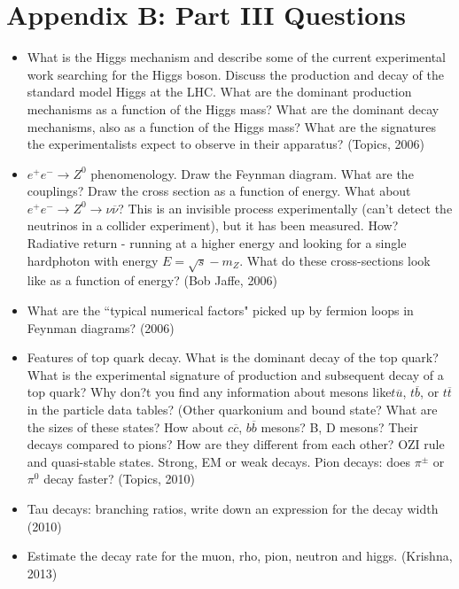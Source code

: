 \documentclass[11pt, oneside]{article}   	%
\theoremstyle{definition}
\numberwithin{equation}{subsection}		%
\begin{document}
\newpage
\section*{Appendix B: Part III Questions}

\begin{itemize}
	\item What is the Higgs mechanism and describe some of the current experimental work searching for the Higgs boson. Discuss the 
	production and decay of the standard model Higgs at the LHC. What are the dominant production mechanisms as a function of the 
	Higgs mass? What are the dominant decay mechanisms, also as a function of the Higgs mass? What are the signatures the 
	experimentalists expect to observe in their apparatus? (Topics, 2006)
	
	\item $e^+ e^-\rightarrow Z^0$ phenomenology. Draw the Feynman diagram. What are the couplings? Draw the cross section as a 
	function of energy. What about $e^+ e^-\rightarrow Z^0 \rightarrow\nu \overline\nu$? This is an invisible process experimentally (can't 
	detect the neutrinos in a collider experiment), but it has been measured. How? Radiative return - running at a higher energy and looking 
	for a single hardphoton with energy $E = \sqrt s - m_Z$. What do these cross-sections look like as a function of energy? (Bob Jaffe, 
	2006)
	
	\item What are the ``typical numerical factors" picked up by fermion loops in Feynman diagrams? (2006)
	
	\item Features of top quark decay. What is the dominant decay of the top quark? What is the experimental signature of production and 
	subsequent decay of a top quark? Why don?t you find any information about mesons like$t\overline u$, $t\overline b$, or $t\overline t$
	in the particle data tables? (Other quarkonium and bound state? What are the sizes of these states? How about $c\overline c$, 
	$b\overline b$ mesons? B, D mesons? Their decays compared to pions? How are they different from each other? OZI rule and 
	quasi-stable states. Strong, EM or weak decays. Pion decays: does $\pi^\pm$ or $\pi^0$ decay faster? (Topics, 2010)
	
	\item Tau decays: branching ratios, write down an expression for the decay width (2010)
	
	\item Estimate the decay rate for the muon, rho, pion, neutron and higgs. (Krishna, 2013)
	

\end{itemize}
\end{document}
